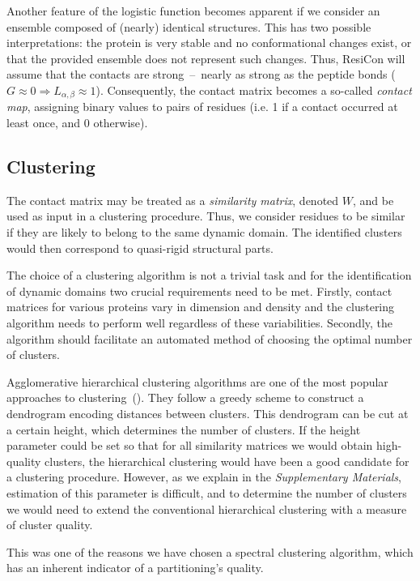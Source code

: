 Another feature of the logistic function becomes apparent if we consider an ensemble composed of (nearly) identical structures.
This has two possible interpretations: the protein is very stable and no conformational changes exist, or that the provided ensemble does not represent such changes.
Thus, ResiCon will assume that the contacts are strong~--~nearly as strong as the peptide bonds ($G\approx 0 \Rightarrow L_{\alpha,\beta}\approx 1$).
Consequently, the contact matrix becomes a so-called \emph{contact map}, assigning binary values to pairs of residues (i.e. 1 if a contact occurred at least once, and 0 otherwise).

\subsection*{Clustering}

The contact matrix may be treated as a \emph{similarity matrix}, denoted $W$, and be used as input in a clustering procedure.
Thus, we consider residues to be similar if they are likely to belong to the same dynamic domain.
The identified clusters would then correspond to quasi-rigid structural parts.

The choice of a clustering algorithm is not a trivial task and for the identification of dynamic domains two crucial requirements need to be met.
Firstly, contact matrices for various proteins vary in dimension and density and the clustering algorithm needs to perform well regardless of these variabilities.
Secondly, the algorithm should facilitate an automated method of choosing the optimal number of clusters. 

Agglomerative hierarchical clustering algorithms are one of the most popular approaches to clustering~(\cite{han2001data}).
They follow a greedy scheme to construct a dendrogram encoding distances between clusters.
This dendrogram can be cut at a certain height, which determines the number of clusters.
If the height parameter could be set so that for all similarity matrices we would obtain high-quality clusters, the hierarchical clustering would have been a good candidate for a clustering procedure.
However, as we explain in the \emph{Supplementary Materials}, estimation of this parameter is difficult, and to determine the number of clusters we would need to extend the conventional hierarchical clustering with a measure of cluster quality.

This was one of the reasons we have chosen a spectral clustering algorithm, which has an inherent indicator of a partitioning's quality.

